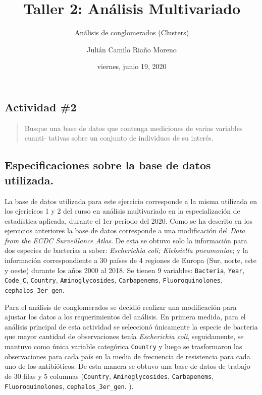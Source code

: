 \documentclass[
]{article}
\title{Taller 2: Análisis Multivariado}
\subtitle{Análisis de conglomerados (Clusters)}
\author{Julián Camilo Riaño Moreno}
\date{viernes, junio 19, 2020}
\begin{document}
\maketitle

{
\setcounter{tocdepth}{3}
\tableofcontents
}
\hypertarget{actividad-2}{%
\subsection{Actividad \#2}\label{actividad-2}}

\begin{quote}
Busque una base de datos que contenga mediciones de varias variables
cuanti- tativas sobre un conjunto de individuos de su interés.
\end{quote}

\hypertarget{especificaciones-sobre-la-base-de-datos-utilizada.}{%
\subsection{Especificaciones sobre la base de datos
utilizada.}\label{especificaciones-sobre-la-base-de-datos-utilizada.}}

La base de datos utilizada para este ejercicio corresponde a la misma
utilizada en los ejericicos 1 y 2 del curso en análisis multivariado en
la especialización de estadística aplicada, durante el 1er periodo del
2020. Como se ha descrito en los ejercicios anteriores la base de datos
corresponde a una modificación del \emph{Data from the ECDC Surveillance
Atlas}. De esta se obtuvo solo la información para dos especies de
bacterias a saber: \emph{Escherichia coli; Klebsiella pneumoniae}; y la
información correspondiente a 30 países de 4 regiones de Europa (Sur,
norte, este y oeste) durante los años 2000 al 2018. Se tienen 9
variables: \texttt{Bacteria}, \texttt{Year}, \texttt{Code\_C},
\texttt{Country}, \texttt{Aminoglycosides}, \texttt{Carbapenems},
\texttt{Fluoroquinolones}, \texttt{cephalos\_3er\_gen}.

Para el análisis de conglomerados se decidió realizar una modificación
para ajustar los datos a los requerimientos del análisis. En primera
medida, para el análisis principal de esta actividad se seleccionó
únicamente la especie de bacteria que mayor cantidad de observaciones
tenía \emph{Escherichia coli}, seguidamente, se mantuvo como única
variable categórica \texttt{Country} y luego se trasformaron las
observaciones para cada país en la media de frecuencia de resistencia
para cada uno de los antibióticos. De esta manera se obtuvo una base de
datos de trabajo de 30 filas y 5 columnas (\texttt{Country},
\texttt{Aminoglycosides}, \texttt{Carbapenems},
\texttt{Fluoroquinolones}, \texttt{cephalos\_3er\_gen}. ).
\end{document}
